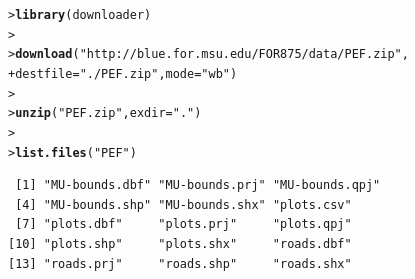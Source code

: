 \documentclass[12pt,oneside]{book}\usepackage[]{graphicx}\usepackage[]{color}
\makeatletter
\newcommand{\hlstr}[1]{\textcolor[rgb]{0.192,0.494,0.8}{#1}}%
\newcommand{\hlstd}[1]{\textcolor[rgb]{0.345,0.345,0.345}{#1}}%
\newcommand{\hlkwc}[1]{\textcolor[rgb]{0.333,0.667,0.333}{#1}}%
\newcommand{\hlkwd}[1]{\textcolor[rgb]{0.737,0.353,0.396}{\textbf{#1}}}%
\newenvironment{kframe}{%
 \def\at@end@of@kframe{}%
 \ifinner\ifhmode%
  \def\at@end@of@kframe{\end{minipage}}%
  \begin{minipage}{\columnwidth}%
 \fi\fi%
 \def\FrameCommand##1{\hskip\@totalleftmargin \hskip-\fboxsep
 \colorbox{shadecolor}{##1}\hskip-\fboxsep
     \hskip-\linewidth \hskip-\@totalleftmargin \hskip\columnwidth}%
 \MakeFramed {\advance\hsize-\width
   \@totalleftmargin\z@ \linewidth\hsize
   \@setminipage}}%
 {\par\unskip\endMakeFramed%
 \at@end@of@kframe}
\newenvironment{knitrout}{}{} %
\makeatother
\begin{document}
\begin{knitrout}
\color{fgcolor}\begin{kframe}
\begin{alltt}
\hlstd{> }\hlkwd{library}\hlstd{(downloader)}
\hlstd{> }
\hlstd{> }\hlkwd{download}\hlstd{(}\hlstr{"http://blue.for.msu.edu/FOR875/data/PEF.zip"}\hlstd{,}
\hlstd{+ }         \hlkwc{destfile}\hlstd{=}\hlstr{"./PEF.zip"}\hlstd{,} \hlkwc{mode}\hlstd{=}\hlstr{"wb"}\hlstd{)}
\hlstd{> }
\hlstd{> }\hlkwd{unzip}\hlstd{(}\hlstr{"PEF.zip"}\hlstd{,} \hlkwc{exdir} \hlstd{=} \hlstr{"."}\hlstd{)}
\hlstd{> }
\hlstd{> }\hlkwd{list.files}\hlstd{(}\hlstr{"PEF"}\hlstd{)}
\end{alltt}
\begin{verbatim}
 [1] "MU-bounds.dbf" "MU-bounds.prj" "MU-bounds.qpj"
 [4] "MU-bounds.shp" "MU-bounds.shx" "plots.csv"    
 [7] "plots.dbf"     "plots.prj"     "plots.qpj"    
[10] "plots.shp"     "plots.shx"     "roads.dbf"    
[13] "roads.prj"     "roads.shp"     "roads.shx"    
\end{verbatim}
\end{kframe}
\end{knitrout}
\end{document}
